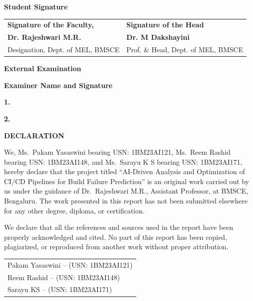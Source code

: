\vspace{10pt}
\textbf{Student Signature}

\vspace{30pt}
\noindent\begin{tabular}{@{}p{}p{}@{}}
\textbf{Signature of the Faculty,} & \textbf{Signature of the Head}\\[12pt]
\textcolor{sigblue}{\textbf{Dr. Rajeshwari M.R.}} & \textbf{Dr. M Dakshayini}\\
Designation, Dept. of MEL, BMSCE & Prof. \& Head, Dept. of MEL, BMSCE
\end{tabular}

\vspace{24pt}
\begin{center}\large\bfseries External Examination\end{center}
\hspace{1em}\textbf{Examiner Name and Signature}

\textbf{1.}

\textbf{2.}
\clearpage

\setcounter{page}{1}
\begin{center}\fontsize{14}{17}\selectfont\bfseries DECLARATION\end{center}
\label{fm:declaration}
We, Ms.\ Pakam Yasaswini bearing USN: 1BM23AI121, Ms.\ Reem Rashid bearing USN: 1BM23AI148, and Ms.\ Sarayu K S bearing USN: 1BM23AI171, hereby declare that the project titled ``AI-Driven Analysis and Optimization of CI/CD Pipelines for Build Failure Prediction'' is an original work carried out by us under the guidance of Dr.\ Rajeshwari M.R., Assistant Professor, at BMSCE, Bengaluru. The work presented in this report has not been submitted elsewhere for any other degree, diploma, or certification.

We declare that all the references and sources used in the report have been properly acknowledged and cited. No part of this report has been copied, plagiarized, or reproduced from another work without proper attribution.

\vspace{30pt}
\begin{flushright}
\begin{tabular}{@{}l@{}}
Pakam Yasaswini -- (USN: 1BM23AI121)\\
Reem Rashid -- (USN: 1BM23AI148)\\
Sarayu KS -- (USN: 1BM23AI171)
\end{tabular}
\end{flushright}
\clearpage


